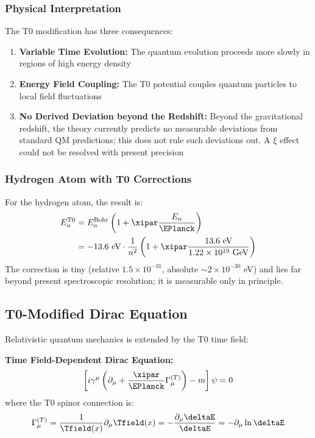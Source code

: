 	\subsubsection{Physical Interpretation}
	The T0 modification has three consequences:
	\begin{enumerate}
		\item \textbf{Variable Time Evolution:} The quantum evolution proceeds more slowly in regions of high energy density
		\item \textbf{Energy Field Coupling:} The T0 potential couples quantum particles to local field fluctuations
		\item \textbf{No Derived Deviation beyond the Redshift:} Beyond the gravitational redshift, the theory currently predicts no measurable deviations from standard QM predictions; this does not rule such deviations out. A $\xi$ effect could not be resolved with present precision
	\end{enumerate}
	\subsubsection{Hydrogen Atom with T0 Corrections}
	For the hydrogen atom, the result is:
	\begin{align}
		E_n^{\text{T0}} &= E_n^{\text{Bohr}} \left(1 + \xipar \frac{E_n}{\EPlanck}\right) \\
		&= -13.6 \text{ eV} \cdot \frac{1}{n^2} \left(1 + \xipar \frac{13.6 \text{ eV}}{1.22 \times 10^{19} \text{ GeV}}\right)
	\end{align}
	The correction is tiny (relative $1.5 \times 10^{-31}$, absolute $\sim 2 \times 10^{-30}$ eV) and lies far beyond present spectroscopic resolution; it is measurable only in principle.
	\subsection{T0-Modified Dirac Equation}
	Relativistic quantum mechanics is extended by the T0 time field:
	\begin{tcolorbox}[colback=magenta!5!white,colframe=magenta!75!black,title={T0 Dirac Equation}]
		\textbf{Time Field-Dependent Dirac Equation:}
		\begin{equation}
			\left[i\gamma^\mu \left(\partial_\mu + \frac{\xipar}{\EPlanck} \Gamma_\mu^{(T)}\right) - m\right]\psi = 0
		\end{equation}
		where the T0 spinor connection is:
		\begin{equation}
			\Gamma_\mu^{(T)} = \frac{1}{\Tfield(x)} \partial_\mu \Tfield(x) = -\frac{\partial_\mu \deltaE}{\deltaE} = -\partial_\mu \ln \deltaE
		\end{equation}
	\end{tcolorbox}
